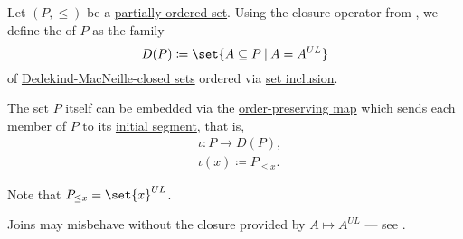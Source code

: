 \begin{definition}\label{def:dedekind_macnielle_completion}
  Let \( (P, \leq) \) be a \hyperref[def:partially_ordered_set]{partially ordered set}. Using the closure operator from , we define the  of \( P \) as the family
  \begin{equation*}
    D(P) \coloneqq \set{ A \subseteq P \given A = A^{UL} }
  \end{equation*}
  of \hyperref[def:dedekind_macnielle_closure]{Dedekind-MacNeille-closed sets} ordered via \hyperref[def:subset]{set inclusion}.

  The set \( P \) itself can be embedded via the \hyperref[def:order_homomorphism/increasing]{order-preserving map} which sends each member of \( P \) to its \hyperref[def:order_interval/ray]{initial segment}, that is,
  \begin{equation*}
    \begin{aligned}
      &\iota: P \to D(P), \\
      &\iota(x) \coloneqq P_{\leq x}.
    \end{aligned}
  \end{equation*}
\end{definition}
\begin{comments}
  \item Note that \( P_{\leq x} = \set{ x }^{UL} \).
  \item Joins may misbehave without the closure provided by \( A \mapsto A^{UL} \) --- see .
\end{comments}

